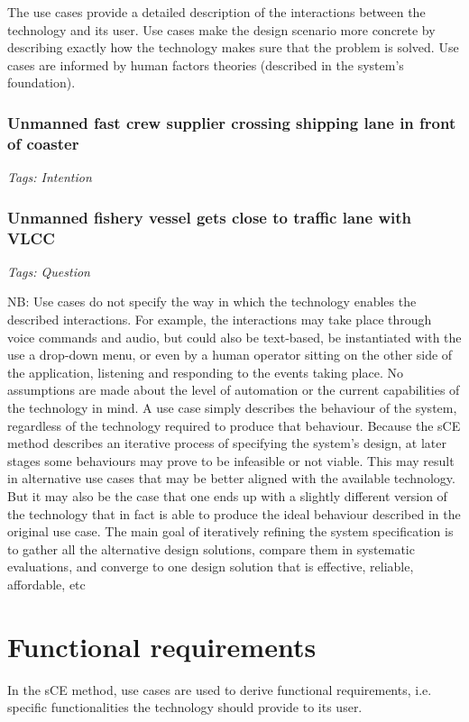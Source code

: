The use cases provide a detailed description of the interactions between the technology and its user. Use cases make the design scenario more concrete by describing exactly how the technology makes sure that the problem is solved. Use cases are informed by human factors theories (described in the system’s foundation).

\subsubsection{Unmanned fast crew supplier crossing shipping lane in front of coaster}
\emph{Tags: Intention}

\subsubsection{Unmanned fishery vessel gets close to traffic lane with VLCC}
\emph{Tags: Question}

NB: Use cases do not specify the way in which the technology enables the described interactions. For example, the interactions may take place through voice commands and audio, but could also be text-based, be instantiated with the use a drop-down menu, or even by a human operator sitting on the other side of the application, listening and responding to the events taking place. No assumptions are made about the level of automation or the current capabilities of the technology in mind. A use case simply describes the behaviour of the system, regardless of the technology required to produce that behaviour. Because the sCE method describes an iterative process of specifying the system’s design, at later stages some behaviours may prove to be infeasible or not viable. This may result in alternative use cases that may be better aligned with the available technology. But it may also be the case that one ends up with a slightly different version of the technology that in fact is able to produce the ideal behaviour described in the original use case. The main goal of iteratively refining the system specification is to gather all the alternative design solutions, compare them in systematic evaluations, and converge to one design solution that is effective, reliable, affordable, etc



\section{Functional requirements}
In the sCE method, use cases are used to derive functional requirements, i.e. specific functionalities the technology should provide to its user.

